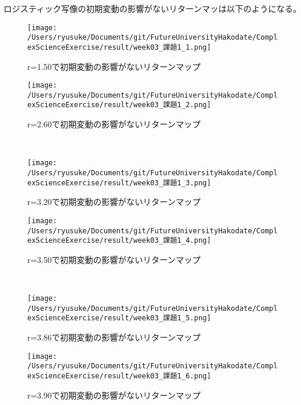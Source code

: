 \documentclass[a4j]{jsarticle}
\begin{document}
ロジスティック写像の初期変動の影響がないリターンマッは以下のようになる。

\begin{figure}[htbp]
 \begin{minipage}{0.5\hsize}
  \begin{center}
   \texttt{[image: /Users/ryusuke/Documents/git/FutureUniversityHakodate/ComplexScienceExercise/result/week03\_課題1\_1.png]}
  \end{center}
  \caption{r=1.50で初期変動の影響がないリターンマップ}
  \label{fig:return-one}
 \end{minipage}
 \begin{minipage}{0.5\hsize}
  \begin{center}
   \texttt{[image: /Users/ryusuke/Documents/git/FutureUniversityHakodate/ComplexScienceExercise/result/week03\_課題1\_2.png]}
  \end{center}
  \caption{r=2.60で初期変動の影響がないリターンマップ}
  \label{fig:return-two}
 \end{minipage} \\
 \begin{minipage}{0.5\hsize}
  \begin{center}
   \texttt{[image: /Users/ryusuke/Documents/git/FutureUniversityHakodate/ComplexScienceExercise/result/week03\_課題1\_3.png]}
  \end{center}
  \caption{r=3.20で初期変動の影響がないリターンマップ}
  \label{fig:return-three}
 \end{minipage}
 \begin{minipage}{0.5\hsize}
  \begin{center}
   \texttt{[image: /Users/ryusuke/Documents/git/FutureUniversityHakodate/ComplexScienceExercise/result/week03\_課題1\_4.png]}
  \end{center}
  \caption{r=3.50で初期変動の影響がないリターンマップ}
  \label{fig:return-four}
 \end{minipage} \\
 \begin{minipage}{0.5\hsize}
  \begin{center}
   \texttt{[image: /Users/ryusuke/Documents/git/FutureUniversityHakodate/ComplexScienceExercise/result/week03\_課題1\_5.png]}
  \end{center}
  \caption{r=3.86で初期変動の影響がないリターンマップ}
  \label{fig:return-five}
 \end{minipage}
 \begin{minipage}{0.5\hsize}
  \begin{center}
   \texttt{[image: /Users/ryusuke/Documents/git/FutureUniversityHakodate/ComplexScienceExercise/result/week03\_課題1\_6.png]}
  \end{center}
  \caption{r=3.90で初期変動の影響がないリターンマップ}
  \label{fig:return-six}
 \end{minipage}
\end{figure}
\end{document}
